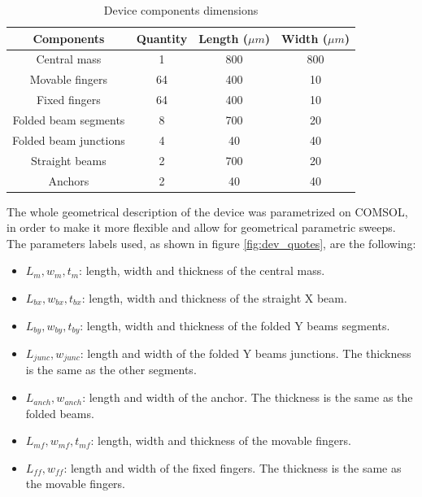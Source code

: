 \documentclass[lettersize,journal]{IEEEtran}
\begin{document}
        \begin{table}[h!]
            \centering
            \caption{Device components dimensions}
            \label{tab:size}
            \begin{tabular}{|c|c|c|c|}
                \hline
                \textbf{Components}   & \textbf{Quantity} & \textbf{Length (\(\mu m\))} & \textbf{Width (\(\mu m\))} \\ \hline
                Central mass          & 1                 & 800                  & 800                 \\ \hline
                Movable fingers       & 64                & 400                  & 10                  \\ \hline
                Fixed fingers         & 64                & 400                  & 10                  \\ \hline
                Folded beam segments  & 8                 & 700                  & 20                  \\ \hline
                Folded beam junctions & 4                 & 40                   & 40                  \\ \hline
                Straight beams        & 2                 & 700                  & 20                  \\ \hline
                Anchors               & 2                 & 40                   & 40                  \\ \hline
            \end{tabular}
        \end{table}
        
        The whole geometrical description of the device was parametrized on COMSOL, in order to make it more flexible and allow for geometrical parametric sweeps. The parameters labels used, as shown in figure \ref{fig:dev_quotes}, are the following:
        
        \begin{itemize}
            \item \(L_m, w_m, t_m\): length, width and thickness of the central mass.
            \item \(L_{bx}, w_{bx}, t_{bx}\): length, width and thickness of the straight X beam.
            \item \(L_{by}, w_{by}, t_{by}\): length, width and thickness of the folded Y beams segments.
            \item \(L_{junc}, w_{junc}\): length and width of the folded Y beams junctions. The thickness is the same as the other segments.
            \item \(L_{anch}, w_{anch}\): length and width of the anchor. The thickness is the same as the folded beams.
            \item \(L_{mf}, w_{mf}, t_{mf}\): length, width and thickness of the movable fingers.
            \item \(L_{ff}, w_{ff}\): length and width of the fixed fingers. The thickness is the same as the movable fingers.
        \end{itemize}
        
\end{document}
